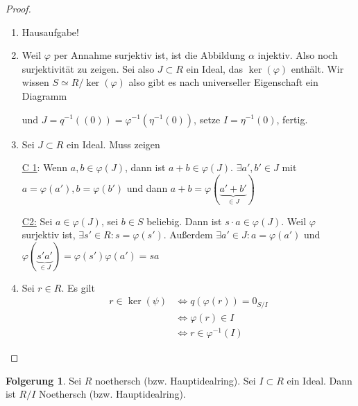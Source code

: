 \documentclass[12pt,parskip=full]{scrartcl}
\newcommand{\heading}{\underline}
\theoremstyle{definition}
\newtheorem{corollary}[theorem]{Folgerung}
\theoremstyle{remark}
\begin{document}
	\begin{proof}
		\begin{enumerate}
			\item Hausaufgabe!
			\item Weil $\varphi$ per Annahme surjektiv ist, ist die Abbildung $\alpha$ injektiv. Also noch surjektivität zu zeigen. Sei also $J \subset R$ ein Ideal, das $\ker(\varphi)$ enthält. Wir wissen $S \simeq R/\ker(\varphi)$ also gibt es nach universeller Eigenschaft ein Diagramm
			\begin{center}
			\end{center}
			und $J = q^{-1}((0)) = \varphi^{-1}(\eta^{-1}(0))$, setze $I = \eta^{-1}(0)$, fertig.
			\item Sei $J \subset R$ ein Ideal. Muss zeigen
			
			\heading{C 1}: Wenn $a,b \in \varphi(J)$, dann ist $a + b \in \varphi(J)$. $\exists a', b' \in J$ mit $a =  \varphi(a'), b = \varphi(b')$ und dann $a + b = \varphi(\underbrace{a' + b'}_{\in J})$
			
			\heading{C2:} Sei $a \in \varphi(J)$, sei $b \in S$ beliebig. Dann ist $s \cdot a \in \varphi(J)$. Weil $\varphi$ surjektiv ist, $\exists s' \in R: s = \varphi(s')$. Außerdem $\exists a' \in J: a = \varphi(a')$ und $\varphi(\underbrace{s' a'}_{\in J}) = \varphi(s') \varphi(a') = sa$
			
			\item Sei $r \in R$. Es gilt
			\begin{align*}
				r \in \ker(\psi) &\Leftrightarrow q(\varphi(r)) = 0_{S/I} \\
				&\Leftrightarrow \varphi(r) \in I \\
				&\Leftrightarrow r \in \varphi^{-1}(I)
			\end{align*}
		\end{enumerate}
	\end{proof}

	\begin{corollary}
		Sei $R$ noethersch (bzw. Hauptidealring). Sei $I \subset R$ ein Ideal. Dann ist $R/I$ Noethersch (bzw. Hauptidealring).
	\end{corollary}
\end{document}
